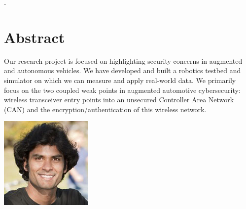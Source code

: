 \documentclass[a0,landscape]{a0poster}
\begin{document}
\vspace{1cm} %


\begin{multicols}{3} %


\color{Navy} %
-
\section*{Abstract}
\large{
Our research project is focused on highlighting security concerns in augmented and autonomous vehicles. We have developed and built a robotics testbed and simulator on which we can measure and apply real-world data. We primarily focus on the two coupled weak points in augmented automotive cybersecurity: wireless transceiver entry points into an unsecured Controller Area Network (CAN) and the encryption/authentication of this wireless network.}

\hfill\includegraphics[scale=0.001]{mohit}



\color{DarkSlateGray} %

\end{multicols}
\end{document}
